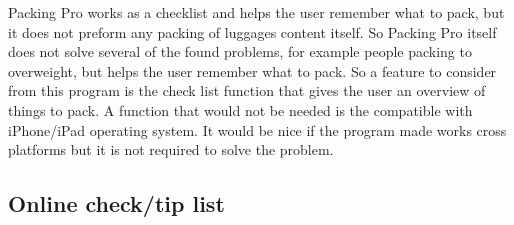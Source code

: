 Packing Pro works as a checklist and helps the user remember what to pack, but it does not preform any packing of luggages content itself. So Packing Pro itself does not solve several of the found problems, for example people packing to overweight, but helps the user remember what to pack. So a feature to consider from this program is the check list function that gives the user an overview of things to pack.
A function that would not be needed is the compatible with iPhone/iPad operating system. It would be nice if the program made works cross platforms but it is not required to solve the problem.






\subsection{Online check/tip list}

